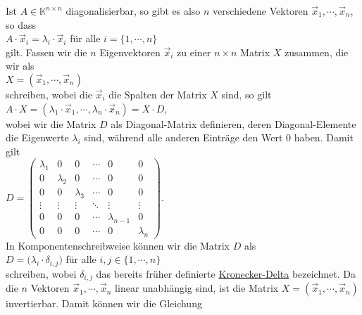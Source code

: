 \remark
Ist  $A \in \mathbb{K}^{n \times n}$ diagonalisierbar, so gibt es also $n$ verschiedene Vektoren
$\vec{x}_1, \cdots, \vec{x}_n$, so dass
\\[0.2cm]
\hspace*{1.3cm}
$A \cdot \vec{x}_i = \lambda_i \cdot \vec{x}_i$ \quad f\"ur alle $i=\{1,\cdots,n\}$
\\[0.2cm]
gilt. Fassen wir die $n$ Eigenvektoren $\vec{x}_i$ zu einer $n \times n$ Matrix $X$ zusammen, die
wir als
\\[0.2cm]
\hspace*{1.3cm}
$X = (\vec{x}_1, \cdots, \vec{x}_n)$
\\[0.2cm]
schreiben, wobei die $\vec{x}_i$ die Spalten der Matrix $X$ sind, so gilt
\\[0.2cm]
\hspace*{1.3cm}
$A \cdot X = (\lambda_1 \cdot \vec{x}_1, \cdots, \lambda_n \cdot \vec{x}_n) = X \cdot D$,
\\[0.2cm]
wobei wir die Matrix $D$ als Diagonal-Matrix definieren, deren Diagonal-Elemente die Eigenwerte
$\lambda_i$ sind, w\"ahrend alle anderen Eintr\"age den Wert $0$ haben.  Damit gilt 
\\[0.2cm]
\hspace*{1.3cm}
$D = \left(
  \begin{array}{llllll}
    \lambda_1 & 0         & 0         & \cdots & 0 & 0 \\ 
    0         & \lambda_2 & 0         & \cdots & 0 & 0 \\
    0         & 0         & \lambda_3 & \cdots & 0 & 0 \\
    \vdots    & \vdots    & \vdots    & \ddots & \vdots & \vdots \\
    0         & 0         & 0         & \cdots  & \lambda_{n-1} & 0 \\
    0         & 0         & 0         & \cdots & 0 & \lambda_n 
  \end{array}
\right)
$.
\\[0.2cm]
In Komponentenschreibweise k\"onnen wir die Matrix $D$ als
\\[0.2cm]
\hspace*{1.3cm}
$D = \bigl(\lambda_i \cdot \delta_{i,j}\bigr)$ \quad f\"ur alle $i,j\in \{1,\cdots,n\}$
\\[0.2cm]
schreiben, wobei $\delta_{i,j}$ das bereits fr\"uher definierte
\href{http://de.wikipedia.org/wiki/Kronecker-Delta}{Kronecker-Delta} bezeichnet.  Da die $n$
Vektoren $\vec{ x}_1, \cdots, \vec{x}_n$ linear unabh\"angig sind, ist 
die Matrix $X = (\vec{x}_1, \cdots, \vec{x}_n)$ invertierbar.  Damit k\"onnen wir die Gleichung
